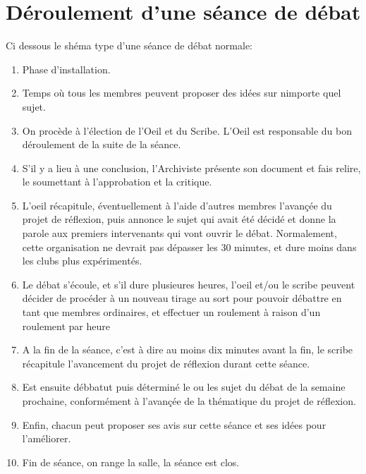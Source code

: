 \documentclass[a4paper,12pt]{article}
\begin{document}
\section{Déroulement d'une séance de débat}
Ci dessous le shéma type d'une séance de débat normale:
\begin{enumerate}
 \item Phase d'installation.
 \item Temps où tous les membres peuvent proposer des idées sur nimporte quel sujet.
 \item On procède à l'élection de l'Oeil et du Scribe. L'Oeil est responsable du bon déroulement de la suite de la séance.
 \item S'il y a lieu à une conclusion, l'Archiviste présente son document et fais relire, le soumettant à l'approbation et la critique.
 \item L'oeil récapitule, éventuellement à l'aide d'autres membres l'avançée du projet de réflexion, puis annonce le sujet qui avait été décidé et donne la parole aux premiers intervenants qui vont ouvrir le débat.
 Normalement, cette organisation ne devrait pas dépasser les 30 minutes, et dure moins dans les clubs plus expérimentés.
 \item Le débat s'écoule, et s'il dure plusieures heures, l'oeil et/ou le scribe peuvent décider de procéder à un nouveau tirage au sort pour pouvoir débattre en tant que membres ordinaires, et effectuer un roulement à raison d'un roulement par heure
 \item A la fin de la séance, c'est à dire au moins dix minutes avant la fin, le scribe récapitule l'avancement du projet de réflexion durant cette séance. 
 \item Est ensuite débbatut puis déterminé le ou les sujet du débat de la semaine prochaine, conformément à l'avançée de la thématique du projet de réflexion.
 \item Enfin, chacun peut proposer ses avis sur cette séance et ses idées pour l'améliorer.
 \item Fin de séance, on range la salle, la séance est clos.
\end{enumerate}
\end{document}
